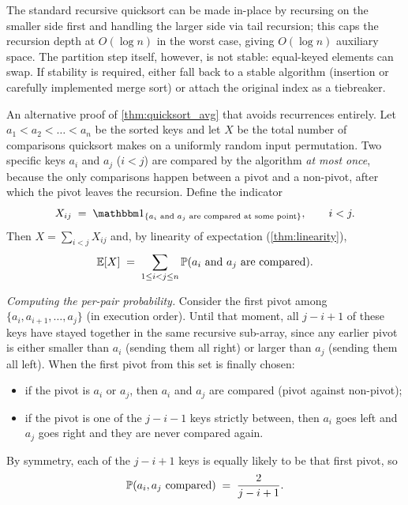 \begin{remark}
The standard recursive quicksort can be made in-place by recursing on the smaller side first and handling the larger side via tail recursion; this caps the recursion depth at $O(\log n)$ in the worst case, giving $O(\log n)$ auxiliary space. The partition step itself, however, is not stable: equal-keyed elements can swap. If stability is required, either fall back to a stable algorithm (insertion or carefully implemented merge sort) or attach the original index as a tiebreaker.
\end{remark}

\begin{example}
\label{ex:quicksort_indicator_analysis}
An alternative proof of \cref{thm:quicksort_avg} that avoids recurrences entirely. Let $a_1 < a_2 < \dots < a_n$ be the sorted keys and let $X$ be the total number of comparisons quicksort makes on a uniformly random input permutation. Two specific keys $a_i$ and $a_j$ ($i < j$) are compared by the algorithm \emph{at most once}, because the only comparisons happen between a pivot and a non-pivot, after which the pivot leaves the recursion. Define the indicator
\[
  X_{ij} \;=\; \indic_{\{a_i \text{ and } a_j \text{ are compared at some point}\}},
  \qquad i < j.
\]
Then $X = \sum_{i<j} X_{ij}$ and, by linearity of expectation (\cref{thm:linearity}),
\[
  \operatorname{\mathbb{E}}[X] \;=\; \sum_{1 \le i < j \le n} \operatorname{\mathbb{P}}(a_i \text{ and } a_j \text{ are compared}).
\]

\medskip
\noindent\textit{Computing the per-pair probability.} Consider the first pivot among $\{a_i, a_{i+1}, \dots, a_j\}$ (in execution order). Until that moment, all $j - i + 1$ of these keys have stayed together in the same recursive sub-array, since any earlier pivot is either smaller than $a_i$ (sending them all right) or larger than $a_j$ (sending them all left). When the first pivot from this set is finally chosen:
\begin{itemize}
  \item if the pivot is $a_i$ or $a_j$, then $a_i$ and $a_j$ are compared (pivot against non-pivot);
  \item if the pivot is one of the $j - i - 1$ keys strictly between, then $a_i$ goes left and $a_j$ goes right and they are never compared again.
\end{itemize}
By symmetry, each of the $j - i + 1$ keys is equally likely to be that first pivot, so
\[
  \operatorname{\mathbb{P}}(a_i, a_j \text{ compared}) \;=\; \frac{2}{j - i + 1}.
\]


\end{example}
